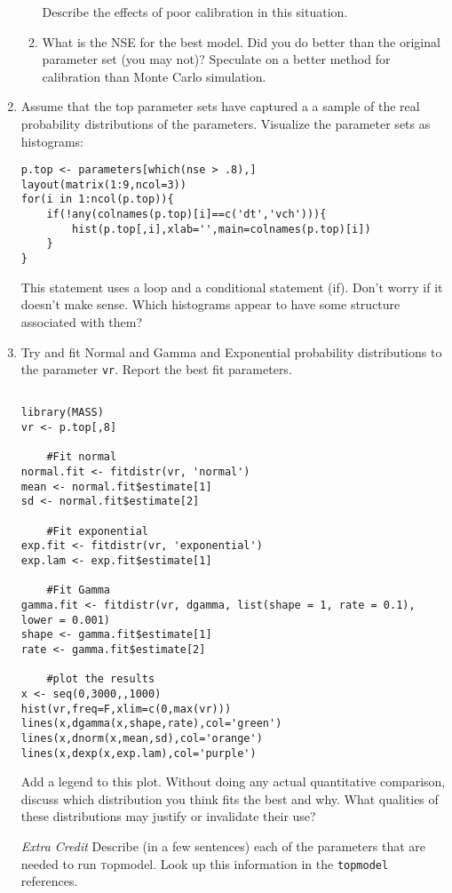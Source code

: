 \documentclass[11pt]{article}
\begin{document}
\begin{enumerate}
\begin{enumerate}
Describe the effects of poor calibration in this situation. 

\item 
What is the NSE for the best model.  Did you do better than the original parameter set (you may not)?  Speculate on a better method for calibration than Monte Carlo simulation. 
\end{enumerate}

\item Assume that the top parameter sets have captured a a sample of the real probability distributions of the parameters. Visualize the parameter sets as histograms:

\begin{verbatim}
p.top <- parameters[which(nse > .8),]
layout(matrix(1:9,ncol=3))
for(i in 1:ncol(p.top)){
    if(!any(colnames(p.top)[i]==c('dt','vch'))){
        hist(p.top[,i],xlab='',main=colnames(p.top)[i])
    }
}
\end{verbatim}

This statement uses a loop and a conditional statement (if). Don't worry if it doesn't make sense.  Which histograms appear to have some structure associated with them?

\item Try and fit Normal and Gamma and Exponential probability distributions to the parameter \texttt{vr}. Report the best fit parameters. 

\begin{verbatim}

library(MASS)
vr <- p.top[,8]

    #Fit normal
normal.fit <- fitdistr(vr, 'normal')
mean <- normal.fit$estimate[1]
sd <- normal.fit$estimate[2]

    #Fit exponential
exp.fit <- fitdistr(vr, 'exponential')
exp.lam <- exp.fit$estimate[1]

    #Fit Gamma
gamma.fit <- fitdistr(vr, dgamma, list(shape = 1, rate = 0.1), lower = 0.001)
shape <- gamma.fit$estimate[1]
rate <- gamma.fit$estimate[2]

	#plot the results
x <- seq(0,3000,,1000)
hist(vr,freq=F,xlim=c(0,max(vr)))
lines(x,dgamma(x,shape,rate),col='green')
lines(x,dnorm(x,mean,sd),col='orange')
lines(x,dexp(x,exp.lam),col='purple')
\end{verbatim}

Add a legend to this plot. Without doing any actual quantitative comparison, discuss which distribution you think fits the best and why.  What qualities of these distributions may justify or invalidate their use?  

\item[\it Extra Credit] Describe (in a few sentences) each of the parameters that are needed to run {\textsc topmodel}. Look up this information in the \texttt{topmodel} references. 

\end{enumerate}
\end{document}
